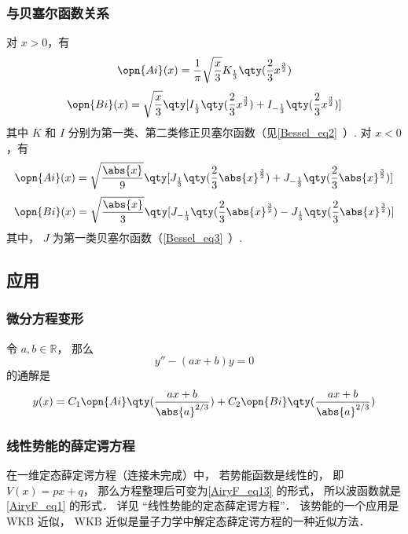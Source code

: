 \subsubsection{与贝塞尔函数关系}
对 $x>0$，有
\begin{equation}
\opn{Ai}(x)=\frac1\pi \sqrt{\frac x3} K_{\frac13} \qty(\frac23 x^{\frac32})
\end{equation}\begin{equation}
\opn{Bi}(x)=\sqrt{\frac x3} \qty[I_{\frac13}\qty(\frac23 x^{\frac32})+I_{-\frac13}\qty(\frac23 x^{\frac32})]
\end{equation}
其中 $K$ 和 $I$ 分别为第一类、第二类修正贝塞尔函数（见\autoref{Bessel_eq2}~）.
对 $x<0$，有
\begin{equation}
\opn{Ai}(x)=\sqrt{\frac{\abs{x}}{9}}\qty[J_{\frac13}\qty(\frac23 \abs{x}^{\frac32})+J_{-\frac13}\qty(\frac23 \abs{x}^{\frac32})]
\end{equation}
\begin{equation}
\opn{Bi}(x)=\sqrt{\frac{\abs{x}}{3}} \qty[J_{-\frac13}\qty(\frac23 \abs{x}^{\frac32})-J_{\frac13}\qty(\frac23 \abs{x}^{\frac32})]
\end{equation}
其中， $J$ 为第一类贝塞尔函数（\autoref{Bessel_eq3}~）.

\subsection{应用}
\subsubsection{微分方程变形}
令 $a, b\in \mathbb R$， 那么
\begin{equation}\label{AiryF_eq13}
y'' - (ax + b) y = 0
\end{equation}
的通解是
\begin{equation}\label{AiryF_eq1}
y(x) = C_1\opn{Ai}\qty(\frac{ax+b}{\abs{a}^{2/3}}) + C_2 \opn{Bi}\qty(\frac{ax+b}{\abs{a}^{2/3}})
\end{equation}

\subsubsection{线性势能的薛定谔方程}
在一维定态薛定谔方程（连接未完成）中， 若势能函数是线性的， 即 $V(x) = px + q$， 那么方程整理后可变为\autoref{AiryF_eq13} 的形式， 所以波函数就是\autoref{AiryF_eq1} 的形式． 详见 “线性势能的定态薛定谔方程”． 该势能的一个应用是 WKB 近似， WKB 近似是量子力学中解定态薛定谔方程的一种近似方法．

